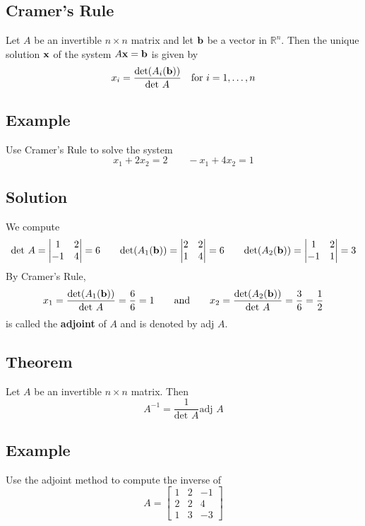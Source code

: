 \subsection*{Cramer's Rule}
Let $A$ be an invertible $n\times n$ matrix and let $\mathbf{b}$ be a vector in $\mathbb{R}^n$.
Then the unique solution $\mathbf{x}$ of the system $A\mathbf{x}=\mathbf{b}$ is given by
\[
    x_i=\frac{\text{det}(A_i(\mathbf{b}))}{\text{det }A} \quad \text{for } i=1,\dots,n
\]

\subsection*{Example}
Use Cramer's Rule to solve the system
\[x_1+2x_2=2 \qquad -x_1+4x_2=1\]

\subsection*{Solution}
We compute
\[
    \text{det }A=\begin{vmatrix}
        1  & 2 \\
        -1 & 4
    \end{vmatrix}=6 \qquad
    \text{det}(A_1(\mathbf{b}))=\begin{vmatrix}
        2 & 2 \\
        1 & 4
    \end{vmatrix}=6 \qquad
    \text{det}(A_2(\mathbf{b}))=\begin{vmatrix}
        1  & 2 \\
        -1 & 1
    \end{vmatrix}=3
\]
By Cramer's Rule,
\[
    x_1=\frac{\text{det}(A_1(\mathbf{b}))}{\text{det }A}=\frac{6}{6}=1 \qquad \text{and} \qquad
    x_2=\frac{\text{det}(A_2(\mathbf{b}))}{\text{det }A}=\frac{3}{6}=\frac{1}{2}
\]
is called the \textbf{adjoint} of $A$ and is denoted by adj $A$.

\subsection*{Theorem}
Let $A$ be an invertible $n\times n$ matrix. Then
\[A^{-1}=\frac{1}{\text{det }A}\text{adj }A\]

\subsection*{Example}
Use the adjoint method to compute the inverse of
\[A=\begin{bmatrix}
        1 & 2 & -1 \\
        2 & 2 & 4  \\
        1 & 3 & -3
    \end{bmatrix}\]

